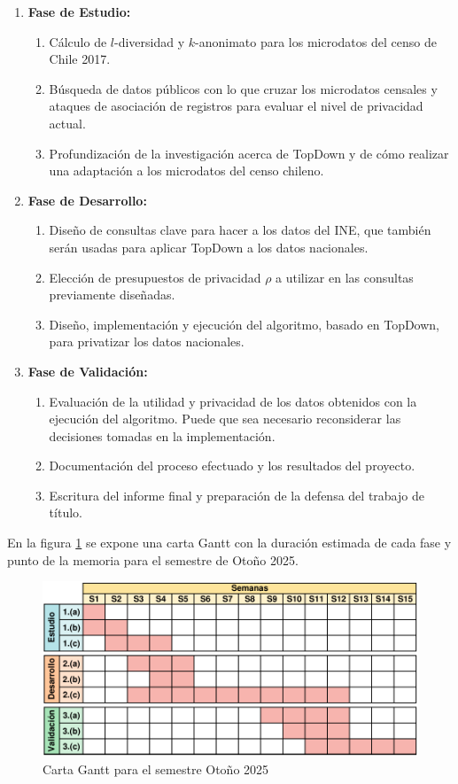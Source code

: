 \documentclass[informe]{upropuesta}
\begin{document}
\begin{enumerate}

\item \textbf{Fase de Estudio:} \begin{enumerate}
    \item Cálculo de $l$-diversidad y $k$-anonimato para los microdatos del censo de Chile 2017.
    \item Búsqueda de datos públicos con lo que cruzar los microdatos censales y ataques de asociación de registros para evaluar el nivel de privacidad actual.
    \item Profundización de la investigación acerca de TopDown y de cómo realizar una adaptación a los microdatos del censo chileno.
\end{enumerate}

\item \textbf{Fase de Desarrollo:} \begin{enumerate}
    \item Diseño de consultas clave para hacer a los datos del INE, que también serán usadas para aplicar TopDown a los datos nacionales.
    \item Elección de presupuestos de privacidad $\rho$ a utilizar en las consultas previamente diseñadas.
    \item Diseño, implementación y ejecución del algoritmo, basado en TopDown, para privatizar los datos nacionales.
\end{enumerate}

\item \textbf{Fase de Validación:} \begin{enumerate}
    \item Evaluación de la utilidad y privacidad de los datos obtenidos con la ejecución del algoritmo. Puede que sea necesario reconsiderar las decisiones tomadas en la implementación.
    \item Documentación del proceso efectuado y los resultados del proyecto.
    \item Escritura del informe final y preparación de la defensa del trabajo de título.
\end{enumerate}
\end{enumerate}

En la figura \ref{fig:Gantt} se expone una carta Gantt con la duración estimada de cada fase y punto de la memoria para el semestre de Otoño 2025.

\begin{figure}[H]
    \centering
    \includegraphics[width=.8\linewidth]{imagenes/investigacion/carta_gantt.pdf}
    \caption{Carta Gantt para el semestre Otoño 2025}
    \label{fig:Gantt}
\end{figure}
\end{document}
